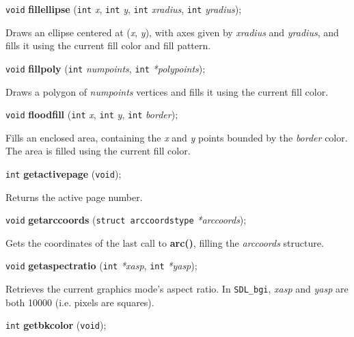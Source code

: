 \documentclass[a4paper,11pt]{article}
\newcommand{\SDLbgi}{\texttt{SDL\_bgi}}
\newcommand{\V}{\texttt{void}}      %
\newcommand{\I}{\texttt{int}}       %
\newcommand{\func}[1]{\textbf{#1}}  %
\newcommand{\A}[1]{\emph{#1}}       %
\newenvironment{bgi}
{ %
  \begin{snugshade}
}
{ %
  \end{snugshade}
}
\begin{document}

\begin{bgi}
\V{} \func{fillellipse} (\I{} \A{x}, \I{} \A{y}, \I{} \A{xradius},
\I{} \A{yradius});
\end{bgi}

Draws an ellipse centered at (\A{x}, \A{y}), with axes given by
\A{xradius} and \A{yradius}, and fills it using the current fill
color and fill pattern.


\begin{bgi}
\V{} \func{fillpoly} (\I{} \A{numpoints}, \I{} \A{*polypoints});
\end{bgi}

Draws a polygon of \A{numpoints} vertices and fills it using the
current fill color.


\begin{bgi}
\V{} \func{floodfill} (\I{} \A{x}, \I{} \A{y}, \I{} \A{border});
\end{bgi}

Fills an enclosed area, containing the \A{x} and \A{y} points bounded
by the \A{border} color. The area is filled using the current fill
color.


\begin{bgi}
\I{} \func{getactivepage} (\V{});
\end{bgi}

Returns the active page number.


\begin{bgi}
\V{} \func{getarccoords} (\texttt{struct arccoordstype} \A{*arccoords});
\end{bgi}

Gets the coordinates of the last call to \func{arc()}, filling the
\A{arccoords} structure.


\begin{bgi}
\V{} \func{getaspectratio} (\I{} \A{*xasp}, \I{} \A{*yasp});
\end{bgi}

Retrieves the current graphics mode's aspect ratio. In \SDLbgi,
\A{xasp} and \A{yasp} are both 10000 (i.e. pixels are squares).


\begin{bgi}
\I{} \func{getbkcolor} (\V{});
\end{bgi}
\end{document}
